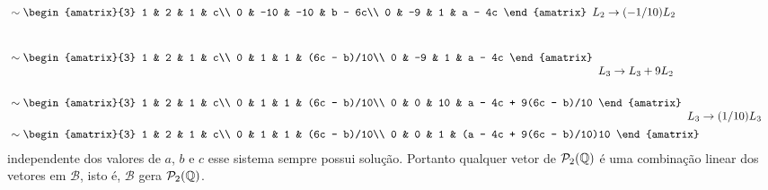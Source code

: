 \begin{exemplos}
\begin{enumerate}
\begin{solucao}
\begin{align}
\begin{array}{l}
          \end{array}\\\nonumber&\sim
          \begin{amatrix}{3}
            1 & 2 & 1 & c\\
            0 & -10 & -10 & b - 6c\\
            0 & -9 & 1 & a - 4c
          \end{amatrix}
          \begin{array}{l}
            \phantom{x}\\L_2 \to (-1/10)L_2\\\phantom{x}
          \end{array}\\\nonumber&\sim
          \begin{amatrix}{3}
            1 & 2 & 1 & c\\
            0 & 1 & 1 & (6c - b)/10\\
            0 & -9 & 1 & a - 4c
          \end{amatrix}
          \begin{array}{l}
            \phantom{x}\\\phantom{x}\\L_3 \to L_3 + 9L_2
          \end{array}\\\nonumber&\sim
          \begin{amatrix}{3}
            1 & 2 & 1 & c\\
            0 & 1 & 1 & (6c - b)/10\\
            0 & 0 & 10 & a - 4c + 9(6c - b)/10
          \end{amatrix}
          \begin{array}{l}
            \phantom{x}\\\phantom{x}\\L_3 \to (1/10)L_3
          \end{array}\\&\sim
          \begin{amatrix}{3}
            1 & 2 & 1 & c\\
            0 & 1 & 1 & (6c - b)/10\\
            0 & 0 & 1 & (a - 4c + 9(6c - b)/10)10
          \end{amatrix}
        \end{align}
        independente dos valores de $a$, $b$ e $c$ esse sistema sempre possui solução. Portanto qualquer vetor de $\mathcal{P}_2(\mathbb{Q})$ é uma combinação linear dos vetores em $\mathcal{B}$, isto é, $\mathcal{B}$ gera $\mathcal{P}_2(\mathbb{Q})$.


\end{solucao}
\end{enumerate}
\end{exemplos}
